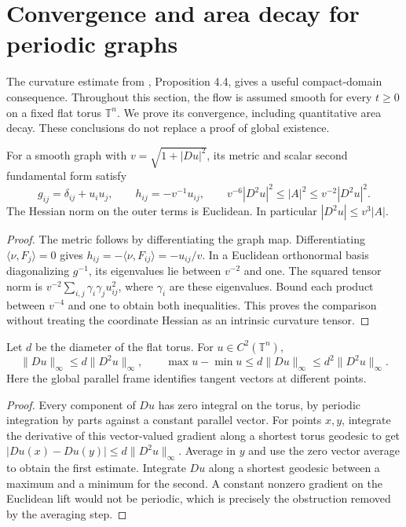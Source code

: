 \chapter{Convergence and area decay for periodic graphs}\label{sec:periodic-graph-convergence}
The curvature estimate from \cite{EH89}, Proposition 4.4, gives a useful compact-domain consequence. Throughout this section, the flow is assumed smooth for every $t\geq0$ on a fixed flat torus $\mathbb T^n$. We prove its convergence, including quantitative area decay. These conclusions do not replace a proof of global existence.

\begin{lemma}\label{lem:graph-curvature-hessian-comparison}
For a smooth graph with $v=\sqrt{1+|Du|^2}$, its metric and scalar second fundamental form satisfy
\[
 g_{ij}=\delta_{ij}+u_i u_j,\qquad h_{ij}=-v^{-1}u_{ij},\qquad
 v^{-6}|D^2u|^2\leq|A|^2\leq v^{-2}|D^2u|^2.
\]
The Hessian norm on the outer terms is Euclidean. In particular $|D^2u|\leq v^3|A|$.
\end{lemma}
\begin{proof}
The metric follows by differentiating the graph map. Differentiating $\langle\nu,F_j\rangle=0$ gives $h_{ij}=-\langle\nu,F_{ij}\rangle=-u_{ij}/v$. In a Euclidean orthonormal basis diagonalizing $g^{-1}$, its eigenvalues lie between $v^{-2}$ and one. The squared tensor norm is $v^{-2}\sum_{i,j}\gamma_i\gamma_j u_{ij}^2$, where $\gamma_i$ are these eigenvalues. Bound each product between $v^{-4}$ and one to obtain both inequalities. This proves the comparison without treating the coordinate Hessian as an intrinsic curvature tensor.
\end{proof}

\begin{lemma}\label{lem:periodic-hessian-oscillation}
Let $d$ be the diameter of the flat torus. For $u\in C^2(\mathbb T^n)$,
\[
 \|Du\|_\infty\leq d\|D^2u\|_\infty,\qquad
 \max u-\min u\leq d\|Du\|_\infty
                  \leq d^2\|D^2u\|_\infty.
\]
Here the global parallel frame identifies tangent vectors at different points.
\end{lemma}
\begin{proof}
Every component of $Du$ has zero integral on the torus, by periodic integration by parts against a constant parallel vector. For points $x,y$, integrate the derivative of this vector-valued gradient along a shortest torus geodesic to get $|Du(x)-Du(y)|\leq d\|D^2u\|_\infty$. Average in $y$ and use the zero vector average to obtain the first estimate. Integrate $Du$ along a shortest geodesic between a maximum and a minimum for the second. A constant nonzero gradient on the Euclidean lift would not be periodic, which is precisely the obstruction removed by the averaging step.
\end{proof}

